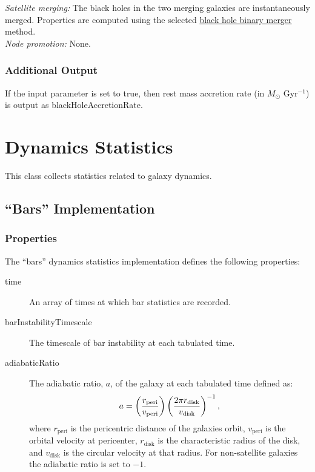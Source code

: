 \noindent\emph{Satellite merging:} The black holes in the two merging galaxies are instantaneously merged. Properties are computed using the selected \href{https://github.com/galacticusorg/galacticus/releases/download/masterRelease/Galacticus_Development.pdf\#methods.blackHoleBinaryMerger}{black hole binary merger} method.\\

\noindent\emph{Node promotion:} None.\\

\subsubsection{Additional Output}

If the {\normalfont \ttfamily [blackHoleOutputAccretion]} input parameter is set to true, then rest mass accretion rate (in $M_\odot$ Gyr$^{-1}$) is output as {\normalfont \ttfamily blackHoleAccretionRate}.

\section{Dynamics Statistics}

This class collects statistics related to galaxy dynamics.

\subsection{``Bars'' Implementation}

\subsubsection{Properties}

The ``bars'' dynamics statistics implementation defines the following properties:
\begin{description}
 \item [{\normalfont \ttfamily time}] An array of times at which bar statistics are recorded.
 \item [{\normalfont \ttfamily barInstabilityTimescale}] The timescale of bar instability at each tabulated time.
 \item [{\normalfont \ttfamily adiabaticRatio}] The adiabatic ratio, $a$, of the galaxy at each tabulated time defined as:
   \begin{equation}
     a = \left( {r_\mathrm{peri} \over v_\mathrm{peri}} \right) \left( {2 \pi r_\mathrm{disk} \over v_\mathrm{disk}} \right)^{-1},
   \end{equation}
   where $r_\mathrm{peri}$ is the pericentric distance of the galaxies orbit, $v_\mathrm{peri}$ is the orbital velocity at pericenter, $r_\mathrm{disk}$ is the characteristic radius of the disk, and $v_\mathrm{disk}$ is the circular velocity at that radius. For non-satellite galaxies the adiabatic ratio is set to $-1$.
\end{description}

